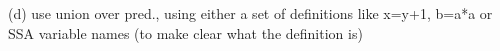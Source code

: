 (d) use union over pred., using either a set of definitions like {x=y+1, b=a*a}
or SSA variable names (to make clear what the definition is)
